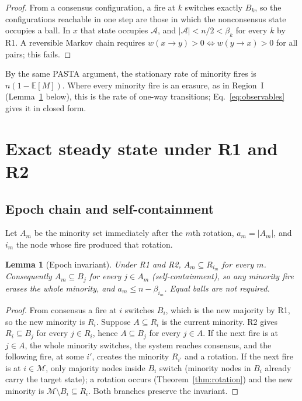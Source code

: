 \documentclass[aps,pre,reprint,superscriptaddress,amsmath,amssymb,longbibliography]{revtex4-2}
\newtheorem{lemma}{Lemma}
\theoremstyle{remark}
\newcommand{\E}{\mathbb{E}}
\begin{document}
\begin{proof}
From a consensus configuration, a fire at $k$ switches exactly $B_k$, so
the configurations reachable in one step are those in which the
nonconsensus state occupies a ball. In $x$ that state occupies
$\mathcal A$, and $|\mathcal A|<n/2<\beta_k$ for every $k$ by R1. A
reversible Markov chain requires $w(x\to y)>0\iff w(y\to x)>0$ for all
pairs; this fails.
\end{proof}

By the same PASTA argument, the stationary rate of minority fires is
$n(1-\E[M])$. Where every minority fire is an erasure, as in Region~I
(Lemma~\ref{lem:epoch} below), this is the rate of one-way transitions;
Eq.~\eqref{eq:observables} gives it in closed form.

\section{Exact steady state under R1 and R2}
\label{sec:band}

\subsection{Epoch chain and self-containment}

Let $A_m$ be the minority set immediately after the $m$th rotation,
$a_m=|A_m|$, and $i_m$ the node whose fire produced that rotation.

\begin{lemma}[Epoch invariant]
\label{lem:epoch}
Under R1 and R2, $A_m\subseteq R_{i_m}$ for every $m$. Consequently
$A_m\subseteq B_j$ for every $j\in A_m$ (self-containment), so any
minority fire erases the whole minority, and $a_m\le n-\beta_{i_m}$.
Equal balls are not required.
\end{lemma}

\begin{proof}
From consensus a fire at $i$ switches $B_i$, which is the new majority
by R1, so the new minority is $R_i$. Suppose $A\subseteq R_i$ is the
current minority. R2 gives $R_i\subseteq B_j$ for every $j\in R_i$, hence
$A\subseteq B_j$ for every $j\in A$. If the next fire is at $j\in A$, the
whole minority switches, the system reaches consensus, and the following
fire, at some $i'$, creates the minority $R_{i'}$ and a rotation. If the
next fire is at $i\in\mathcal M$, only majority nodes inside $B_i$ switch
(minority nodes in $B_i$ already carry the target state); a rotation
occurs (Theorem~\ref{thm:rotation}) and the new minority is
$\mathcal M\setminus B_i\subseteq R_i$. Both branches preserve the
invariant.
\end{proof}
\end{document}
